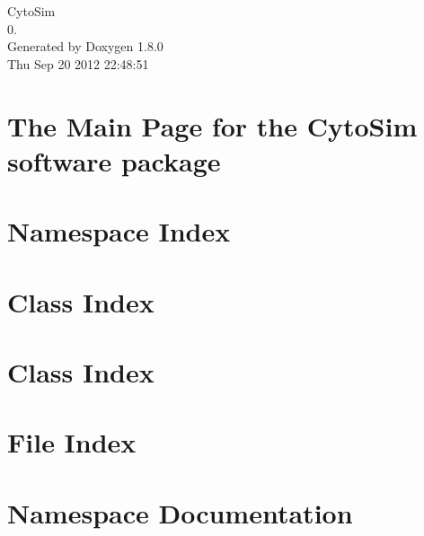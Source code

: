 \documentclass{book}
\begin{document}
\hypersetup{pageanchor=false,citecolor=blue}
\begin{titlepage}
\vspace*{7cm}
\begin{center}
{\Large Cyto\-Sim \\[1ex]\large 0. }\\
\vspace*{1cm}
{\large Generated by Doxygen 1.8.0}\\
\vspace*{0.5cm}
{\small Thu Sep 20 2012 22:48:51}\\
\end{center}
\end{titlepage}
\clearemptydoublepage
{}
\tableofcontents
\clearemptydoublepage
{}
\hypersetup{pageanchor=true,citecolor=blue}
\chapter{The Main Page for the Cyto\-Sim software package}
\label{index}\hypertarget{index}{}
\chapter{Namespace Index}

\chapter{Class Index}

\chapter{Class Index}

\chapter{File Index}

\chapter{Namespace Documentation}

\end{document}
